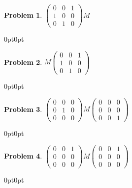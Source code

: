 \documentclass[12pt]{article}
\newenvironment{answer}
    {\begin{adjustwidth}{0pt}{0pt}}
    {\end{adjustwidth}}
\newtheorem{problem}{Problem}
\theoremstyle{remark}  %
\begin{document}
\begin{problem} $
    \begin{pmatrix}
        0 & 0 & 1 \\
        1 & 0 & 0 \\
        0 & 1 & 0
    \end{pmatrix} M
    $
\end{problem}
\begin{answer}
    
\end{answer}
\begin{problem} $ M
    \begin{pmatrix}
        0 & 0 & 1 \\
        1 & 0 & 0 \\
        0 & 1 & 0
    \end{pmatrix}
    $
\end{problem}
\begin{answer}
    
\end{answer}
\begin{problem} $ 
    \begin{pmatrix}
        0 & 0 & 0 \\
        0 & 1 & 0 \\
        0 & 0 & 0
    \end{pmatrix}
    M
    \begin{pmatrix}
        0 & 0 & 0 \\
        0 & 0 & 0 \\
        0 & 0 & 1
    \end{pmatrix}
    $
\end{problem}
\begin{answer}
    
\end{answer}
\begin{problem} $ 
    \begin{pmatrix}
        0 & 0 & 1 \\
        0 & 0 & 0 \\
        0 & 0 & 0
    \end{pmatrix}
    M
    \begin{pmatrix}
        0 & 0 & 1 \\
        0 & 0 & 0 \\
        0 & 0 & 0
    \end{pmatrix}
    $
\end{problem}
\begin{answer}
    
\end{answer}
\end{document}
